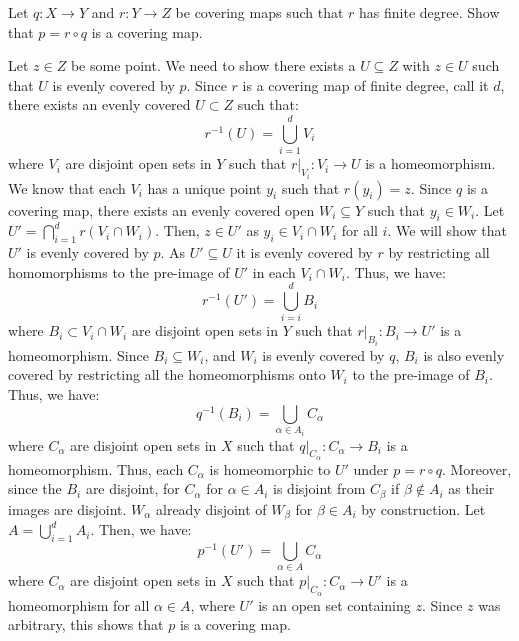 \documentclass[12pt]{article}
\begin{document}
\begin{problab}{6}
Let \( q : X \to Y \) and \( r : Y \to Z \) be covering maps such that \( r \) has finite degree. Show that \( p = r \circ q \) is a covering map.
\end{problab}
\begin{solu}
    Let $z \in Z$ be some point. We need to show there exists a $U \subseteq Z$ with $z \in U$ such that $U$ is evenly covered by $p$. Since $r$ is a covering map of finite degree, call it $d$, there exists an evenly covered $U \subset Z$ such that: 
    \[ r^{-1}(U) = \bigcup_{i = 1}^d V_i \]
    where $V_i$ are disjoint open sets in $Y$ such that $r|_{V_i}: V_i \to U$ is a homeomorphism. \bbni
    We know that each $V_i$ has a unique point $y_i$ such that $r(y_i) = z$. Since $q$ is a covering map, there exists an evenly covered open $W_i \subseteq Y$ such that $y_i \in W_i$. Let $U' = \bigcap_{i = 1}^d r(V_i \cap W_i)$. Then, $z \in U'$ as $y_i \in V_i \cap W_i$ for all $i$. We will show that $U'$ is evenly covered by $p$. \bbni
    As $U' \subseteq U$ it is evenly covered by $r$ by restricting all homomorphisms to the pre-image of $U'$ in each $V_i \cap W_i$. Thus, we have:
    \[r^{-1}(U') = \bigcup_{i = i}^d B_{i}\]
    where $B_i \subset V_i \cap W_i$ are disjoint open sets in $Y$ such that $r|_{B_i}: B_i \to U'$ is a homeomorphism. \bbni
    Since $B_i \subseteq W_i$, and $W_i$ is evenly covered by $q$, $B_i$ is also evenly covered by restricting all the homeomorphisms onto $W_i$ to the pre-image of $B_i$. Thus, we have:
    \[q^{-1}(B_i) = \bigcup_{\alpha \in A_i} C_{\alpha}\]
    where $C_{\alpha}$ are disjoint open sets in $X$ such that $q|_{C_{\alpha}}: C_{\alpha} \to B_i$ is a homeomorphism. Thus, each $C_\alpha$ is homeomorphic to $U'$ under $p = r \circ q$. \bbni  
    Moreover, since the $B_i$ are disjoint, for $C_\alpha$ for $\alpha \in A_i$ is disjoint from $C_\beta$ if $\beta \not \in A_i$ as their images are disjoint. $W_\alpha$ already disjoint of $W_\beta$ for $\beta \in A_i$ by construction. \bbni 
    Let $A = \bigcup_{i = 1}^d A_i$. Then, we have:
    \[p^{-1}(U') = \bigcup_{\alpha \in A} C_\alpha\]
    where $C_\alpha$ are disjoint open sets in $X$ such that $p|_{C_\alpha}: C_\alpha \to U'$ is a homeomorphism for all $\alpha \in A$, where $U'$ is an open set containing $z$. Since $z$ was arbitrary, this shows that $p$ is a covering map.
\end{solu}
\end{document}
